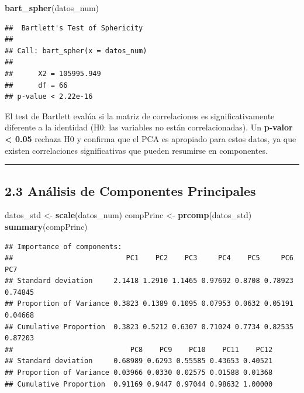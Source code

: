 \documentclass[
]{article}
\newenvironment{Shaded}{\begin{snugshade}}{\end{snugshade}}
\newcommand{\FunctionTok}[1]{\textcolor[rgb]{0.13,0.29,0.53}{\textbf{#1}}}
\newcommand{\NormalTok}[1]{#1}
\newcommand{\OtherTok}[1]{\textcolor[rgb]{0.56,0.35,0.01}{#1}}
\begin{document}
\begin{Shaded}
\begin{Highlighting}[]
\FunctionTok{bart\_spher}\NormalTok{(datos\_num)}
\end{Highlighting}
\end{Shaded}

\begin{verbatim}
##  Bartlett's Test of Sphericity
## 
## Call: bart_spher(x = datos_num)
## 
##      X2 = 105995.949
##      df = 66
## p-value < 2.22e-16
\end{verbatim}

El test de Bartlett evalúa si la matriz de correlaciones es
significativamente diferente a la identidad (H0: las variables no están
correlacionadas). Un \textbf{p-valor \textless{} 0.05} rechaza H0 y
confirma que el PCA es apropiado para estos datos, ya que existen
correlaciones significativas que pueden resumirse en componentes.

\begin{center}\rule{0.5\linewidth}{0.5pt}\end{center}

\subsection{2.3 Análisis de Componentes
Principales}\label{anuxe1lisis-de-componentes-principales}

\begin{Shaded}
\begin{Highlighting}[]
\NormalTok{datos\_std }\OtherTok{\textless{}{-}} \FunctionTok{scale}\NormalTok{(datos\_num)}
\NormalTok{compPrinc }\OtherTok{\textless{}{-}} \FunctionTok{prcomp}\NormalTok{(datos\_std)}
\FunctionTok{summary}\NormalTok{(compPrinc)}
\end{Highlighting}
\end{Shaded}

\begin{verbatim}
## Importance of components:
##                           PC1    PC2    PC3     PC4    PC5     PC6     PC7
## Standard deviation     2.1418 1.2910 1.1465 0.97692 0.8708 0.78923 0.74845
## Proportion of Variance 0.3823 0.1389 0.1095 0.07953 0.0632 0.05191 0.04668
## Cumulative Proportion  0.3823 0.5212 0.6307 0.71024 0.7734 0.82535 0.87203
##                            PC8    PC9    PC10    PC11    PC12
## Standard deviation     0.68989 0.6293 0.55585 0.43653 0.40521
## Proportion of Variance 0.03966 0.0330 0.02575 0.01588 0.01368
## Cumulative Proportion  0.91169 0.9447 0.97044 0.98632 1.00000
\end{verbatim}
\end{document}
